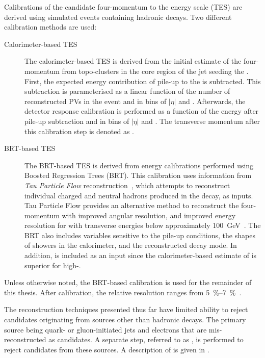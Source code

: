 Calibrations of the \tauhadvis candidate four-momentum to the \tauhadvis energy
scale (TES) are derived using simulated events containing hadronic \taulepton
decays. Two different calibration methods are used:
\begin{description}

\item[Calorimeter-based TES] The calorimeter-based TES is derived from the
  initial estimate of the \tauhadvis four-momentum from topo-clusters in the
  core region of the jet seeding the \tauhadvis. First, the expected energy
  contribution of pile-up to the \tauhadvis is subtracted. This subtraction is
  parameterised as a linear function of the number of reconstructed PVs in the
  event and in bins of \tauhadvis $|\eta|$ and \Ntracks. Afterwards, the
  detector response calibration is performed as a function of the \tauhadvis
  energy after pile-up subtraction and in bins of \tauhadvis $|\eta|$ and
  \Ntracks. The \tauhadvis transverse momentum after this calibration step is
  denoted as \pTLC.

\item[BRT-based TES] The BRT-based TES is derived from \tauhadvis energy
  calibrations performed using Boosted Regression Trees (BRT). This calibration
  uses information from \emph{Tau Particle Flow}
  reconstruction~\cite{PERF-2014-06}, which attempts to reconstruct individual
  charged and neutral hadrons produced in the \taulepton decay, as inputs. Tau
  Particle Flow provides an alternative method to reconstruct the \tauhadvis
  four-momentum with improved angular resolution, and improved energy resolution
  for \tauhadvis with transverse energies below approximately
  \SI{100}{\GeV}~\cite{PERF-2014-06}. The BRT also includes variables sensitive
  to the pile-up conditions, the shapes of showers in the calorimeter, and the
  reconstructed \taulepton decay mode. In addition, \pTLC is included as an
  input since the calorimeter-based estimate of \tauhadvis \pT is superior for
  high-\pT \tauhadvis.

\end{description}
Unless otherwise noted, the BRT-based calibration is used for the remainder of
this thesis. After calibration, the relative \tauhadvis \pT resolution ranges
from \SIrange{5}{7}{\percent}~\cite{ATLAS-CONF-2017-029}.

The \tauhadvis reconstruction techniques presented thus far have limited ability
to reject \tauhadvis candidates originating from sources other than hadronic
\taulepton decays. The primary source being quark- or gluon-initiated jets and
electrons that are mis-reconstructed as \tauhadvis candidates. A separate step,
referred to as \tauid, is performed to reject \tauhadvis candidates from these
sources. A description of \tauid is given in .


